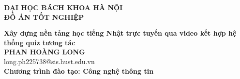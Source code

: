 \documentclass[DoAn.tex]{subfiles}
\begin{document}
\begin{titlepage}
\thispagestyle{empty}
\begin{center}

{\textbf{\large{ĐẠI HỌC BÁCH KHOA HÀ NỘI}}}\\[4cm]

{\textbf{\huge{ ĐỒ ÁN TỐT NGHIỆP}}}\\[1cm]
{\textbf{\Large{Xây dựng nền tảng học tiếng Nhật trực tuyến qua video kết hợp hệ thống quiz tương tác}}\\[1cm]

{\textbf{\large{PHAN HOÀNG LONG}}}\\
{\large{long.ph225738@sis.hust.edu.vn}}\\[0.5cm]

{\textbf{\large{Chương trình đào tạo: Công nghệ thông tin
}}}\\

\vspace{4cm}
\begin{table}[H]
\centering
{}
\end{table}}
\end{center}



\end{titlepage}
\end{document}
